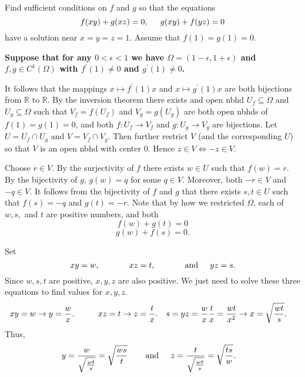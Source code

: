 \documentclass[11pt]{article}
\begin{document}
\newpage

\noindent {\bf [3]} Find sufficient conditions on $f$ and $g$ so that the equations
\[
f(xy)+g(xz)=0,\hspace{.2in}g(xy)+f(yz)=0 
\]
\noindent have a solution near $x=y=z=1$. Assume that $f(1)=g(1)=0$.

\vspace{.3in}

\noindent [proof]

{\bf Suppose that for any $0<\epsilon<1$ we have $\Omega=\left(1-\epsilon,1+\epsilon\right)$ and $f,g\in C^1(\Omega)$ with $f^{'}(1)\neq 0$ and $g^{'}(1)\neq 0$.} 

\vspace{.1in}

It follows that the mappings $x\mapsto f^{'}(1)x$ and $x\mapsto g^{'}(1)x$ are both bijections from $\mathbb{R}$ to $\mathbb{R}$. By the inversion theorem there exists and open nbhd $U_f\subseteq \Omega$ and $U_g\subseteq \Omega$ such that $V_f=f(U_f)$ and $V_g=g(U_g)$
are both open nbhds of $f(1)=g(1)=0$, and both $f:U_f\rightarrow V_f$ and $g:U_g\rightarrow V_g$ are bijections. Let $U=U_f\cap U_g$ and $V=V_f\cap V_g$. Then further restrict $V$ (and the corresponding $U$) so that $V$ is an open nbhd with center $0$. Hence $z\in V \iff -z\in V$. 

\vspace{.1in}

Choose $r\in V$. By the surjectivity of $f$ there exists $w\in U$ such that $f(w)=r$. By the bijectivity of $g$, $g(w)=q$ for some $q\in V$. Moreover, both $-r\in V$ and $-q\in V$. It follows from the bijectivity of $f$ and $g$ that there exists $s,t\in U$ such that $f(s)=-q$ and $g(t)=-r$. Note that by how we restricted $\Omega$, each of $w,s,$ and $t$ are positive numbers, and both
\[
f(w)+g(t)=0
\]  
\[
g(w)+f(s)=0.
\]
\vspace{.1in}

Set
\[
xy=w,\hspace{.5in}xz=t,\hspace{.5in}\text{and}\hspace{.2in}yz=s.
\]
Since $w,s,t$ are positive, $x,y,z$ are also positive. We just need to solve these three equations to find values for $x,y,z$.
\begin{align*}
xy=w\rightarrow y=\frac{w}{x}. &\hspace{.4in}	xz=t\rightarrow z=\frac{t}{x}.	&&	s=yz=\frac{w}{x}\frac{t}{x}=\frac{wt}{x^2}\rightarrow x=\sqrt{\frac{wt}{s}}. 
\end{align*}
\noindent Thus,
\begin{align*}
y=\frac{w}{\sqrt{\frac{wt}{s}}}=\sqrt{\frac{ws}{t}}	&\hspace{.3in}\text{and}\hspace{.2in} z=\frac{t}{\sqrt{\frac{wt}{s}}}=\sqrt{\frac{ts}{w}}.
\end{align*}
\end{document}
